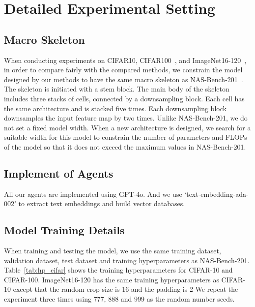 \section{Detailed Experimental Setting}
\subsection{Macro Skeleton}
When conducting experiments on CIFAR10, CIFAR100~\cite{krizhevsky2009learning}, and ImageNet16-120~\cite{chrabaszcz2017downsampled}, in order to compare fairly with the compared methods, we constrain the model designed by our methods to have the same macro skeleton as NAS-Bench-201~\cite{dong2020bench}.
The skeleton is initiated with a stem block. The main body of the skeleton includes three stacks of cells, connected by a downsampling block.
Each cell has the same architecture and is stacked five times.
Each downsampling block downsamples the input feature map by two times.
Unlike NAS-Bench-201, we do not set a fixed model width.
When a new architecture is designed, we search for a suitable width for this model to constrain the number of parameters and FLOPs of the model so that it does not exceed the maximum values in NAS-Bench-201.
\subsection{Implement of Agents}
All our agents are implemented using GPT-4o.
And we use `text-embedding-ada-002' to extract text embeddings and build vector databases.
\begin{table}[ht]
    \centering
    \caption{The training hyperparameters for CIFAR-10 and CIFAR-100.}
    \vspace{-5mm}
\end{table}
\subsection{Model Training Details}
When training and testing the model, we use the same training dataset, validation dataset, test dataset and training hyperparameters as NAS-Bench-201.
Table~\ref{tab:hp_cifar} shows the training hyperparameters for CIFAR-10 and CIFAR-100.
ImageNet16-120 has the same training hyperparameters as CIFAR-10 except that the random crop size is 16 and the padding is 2
We repeat the experiment three times using 777, 888 and 999 as the random number seeds.

